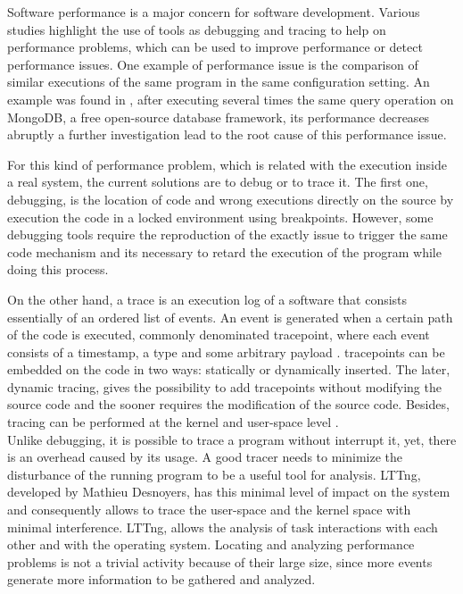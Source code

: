 Software performance is a major concern for software development. Various studies highlight the use of tools as debugging and tracing to help on performance problems, which can be used to improve performance or detect performance issues.
One example of performance issue is the comparison of similar executions of the same program in the same configuration setting. An example was found in \cite{doray_article}, after executing several times the same query operation on MongoDB, a free open-source database framework, its performance decreases abruptly a further investigation lead to the root cause of this performance issue.

For this kind of performance problem, which is related with the execution inside a real system, the current solutions are to debug or to trace it. The first one, debugging, is the location of code and wrong executions directly on the source by execution the code in a locked environment using breakpoints. However, some debugging tools require the reproduction of the exactly issue to trigger the same code mechanism and its necessary to retard the execution of the program while doing this process.

On the other hand, a trace is an execution log of a software that consists essentially of an ordered list of events. An event is generated when a certain path of the code is executed, commonly denominated tracepoint, where each event consists of a timestamp, a type and some arbitrary payload \cite{francis1}. tracepoints can be embedded on the code in two ways: statically or dynamically inserted. The later, dynamic tracing, gives the possibility to add tracepoints without modifying the source code and the sooner requires the modification of the source code. Besides, tracing can be performed at the kernel and user-space level \cite{francis1}.\\

Unlike debugging, it is possible to trace a program without interrupt it, yet, there is an overhead caused by its usage. A good tracer needs to minimize the disturbance of the running program to be a useful tool for analysis. LTTng\cite{desnoyers}, developed by Mathieu Desnoyers, has this minimal level of impact on the system and consequently allows to trace the user-space and the kernel space with minimal interference. LTTng, allows the analysis of task interactions with each other and with the operating system. Locating and analyzing performance problems is not a trivial activity because of their large size, since more events generate more information to be gathered and analyzed. 

